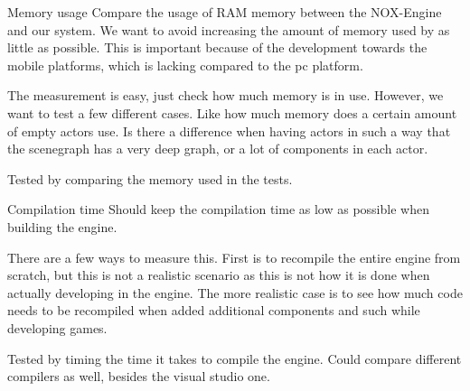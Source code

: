 Memory usage
Compare the usage of RAM memory between the NOX-Engine and our system.
We want to avoid increasing the amount of memory used by as little as possible.
This is important because of the development towards the mobile platforms, which is lacking compared to the pc platform.

The measurement is easy, just check how much memory is in use.
However, we want to test a few different cases.
Like how much memory does a certain amount of empty actors use.
Is there a difference when having actors in such a way that the scenegraph has a very deep graph, or a lot of components in each actor.

Tested by comparing the memory used in the tests.





Compilation time
Should keep the compilation time as low as possible when building the engine.

There are a few ways to measure this.
First is to recompile the entire engine from scratch, but this is not a realistic scenario as this is not how it is done when actually developing in the engine.
The more realistic case is to see how much code needs to be recompiled when added additional components and such while developing games.

Tested by timing the time it takes to compile the engine. Could compare different compilers as well, besides the visual studio one.
